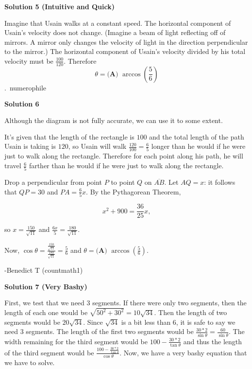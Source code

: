 \begin{enumerate}
 


 



\textbf{Solution 5 (Intuitive and Quick)}

Imagine that Usain walks at a constant speed. The horizontal component of Usain's velocity does not change. (Imagine a beam of light reflecting off of mirrors. A mirror only changes the velocity of light in the direction perpendicular to the mirror.) The horizontal component of Usain's velocity divided by his total velocity must be $\frac{100}{120}$. Therefore 
 \[\theta=\boxed{\textbf{(A) } \arccos\left(\frac{5}{6}\right)}\].~numerophile

 



\textbf{Solution 6}

Although the diagram is not fully accurate, we can use it to some extent. 

 It's given that the length of the rectangle is $100$ and the total length of the path Usain is taking is $120$, so Usain will walk $\frac{120}{100} = \frac{6}{5}$ longer than he would if he were just to walk along the rectangle. Therefore for each point along his path, he will travel $\frac{6}{5}$ farther than he would if he were just to walk along the rectangle. 

 Drop a perpendicular from point $P$ to point $Q$ on $\overline{AB}$. Let $AQ = x$: it follows that $QP = 30$ and $PA = \frac{6}{5}x.$ By the Pythagorean Theorem, 

 
 \[x^2 + 900 = \frac{36}{25}x,\]

 so $x = \frac{150}{\sqrt{11}}$ and $\frac{6x}{5} = \frac{180}{\sqrt{11}}$. 

 Now, $\cos\theta = \frac{\frac{150}{\sqrt{11}}}{\frac{180}{\sqrt{11}}} = \frac{5}{6}$ and $\theta = \boxed{\textbf{(A) } \arccos\left(\frac{5}{6}\right)}.$

 
-Benedict T (countmath1)

 


 



\textbf{Solution 7 (Very Bashy)}

First, we test that we need $3$ segments. If there were only two segments, then the length of each one would be $\sqrt{50^2+30^2} = 10\sqrt{34}$. Then the length of two segments would be $20\sqrt{34}$. Since $\sqrt{34}$ is a bit less than $6$, it is safe to say we need $3$ segments. The length of the first two segments would be $\frac{30*2}{\sin{\theta}} = \frac{60}{\sin{\theta}}$. The width  remaining for the third segment would be $100 - \frac{30*2}{\tan{\theta}}$ and thus the length of the third segment would be $\frac{100 - \frac{30*2}{\tan{\theta}}}{\cos{\theta}}$. Now, we have a very bashy equation that we have to solve.


\end{enumerate}
